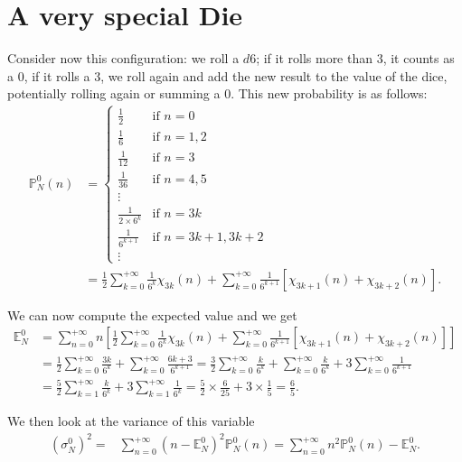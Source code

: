 \documentclass[a4paper,oneside,11pt]{book}
\renewcommand{\Pr}{\mathbb{P}}
\begin{document}
\section{A very special Die}
Consider now this configuration: we roll a $d6$; if it rolls more than $3$, it counts as a $0$, if it rolls a $3$, we roll again and add the new result to the value of the dice, potentially rolling again or summing a $0$. This new probability is as follows:
\begin{align}
	\Pr_N^0\left(n\right)
	&=\left\{\begin{array}{cl}
		\frac12 							& \mbox{if } n=0	\\
		\frac16 							& \mbox{if } n=1,2	\\
		\frac1{12} 						& \mbox{if } n=3	\\
		\frac1{36} 						& \mbox{if } n=4,5	\\
		\vdots								&	\\
		\frac1{2\times6^{k}} 	& \mbox{if } n=3k	\\
		\frac1{6^{k+1}} 			& \mbox{if } n=3k+1,3k+2	\\
		\vdots
	\end{array}\right.
\\
	&=\frac12\sum_{k=0}^{+\infty}\frac1{6^k}\chi_{3k}(n)
	+\sum_{k=0}^{+\infty}\frac1{6^{k+1}}
	\left[
		\chi_{3k+1}(n)
		+\chi_{3k+2}(n)
	\right].
\end{align}

We can now compute the expected value and we get
\begin{align}
	\mathbb{E}_N^0
	&=\sum_{n=0}^{+\infty}n\left[
		\frac12\sum_{k=0}^{+\infty}\frac1{6^k}\chi_{3k}(n)
		+\sum_{k=0}^{+\infty}\frac1{6^{k+1}}
		\left[
			\chi_{3k+1}(n)
			+\chi_{3k+2}(n)
		\right]
	\right]
\\
	&=\frac12\sum_{k=0}^{+\infty}\frac{3k}{6^k}
	+\sum_{k=0}^{+\infty}\frac{6k+3}{6^{k+1}}
	=\frac32\sum_{k=0}^{+\infty}\frac{k}{6^k}
	+\sum_{k=0}^{+\infty}\frac{k}{6^{k}}
	+3\sum_{k=0}^{+\infty}\frac1{6^{k+1}}
\\
	&=\frac52\sum_{k=1}^{+\infty}\frac{k}{6^k}
	+3\sum_{k=1}^{+\infty}\frac1{6^k}
	=\frac52\times\frac6{25}
	+3\times\frac15=\frac65.
\end{align}

We then look at the variance of this variable
\begin{align}
	\left(\sigma_N^0\right)^2
	=&\sum_{n=0}^{+\infty}
	\left(n-\mathbb E_N^0\right)^2\Pr_N^0\left(n\right)
	=\sum_{n=0}^{+\infty}
	n^2\Pr_N^0\left(n\right)
	-\mathbb E_N^0.
\end{align}
\end{document}
